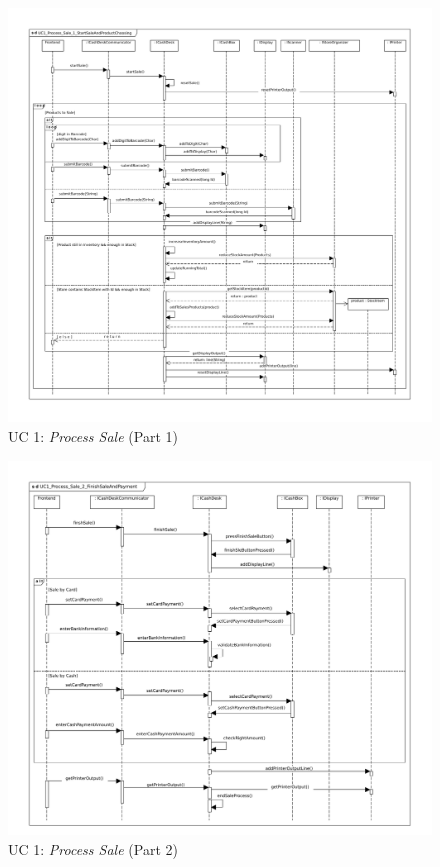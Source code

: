 		
			\begin{figure}[!h]
				\centering
				\includegraphics[width = 1\textwidth]{img/UC1_Process_Sale_1_StartSaleAndProductChoosing.pdf}
				\caption{UC 1: \textit{Process Sale} (Part 1)}
				\label{MS_UC1_1}
			\end{figure}
			
			\begin{figure}[!h]
				\centering
				\includegraphics[width = 1\textwidth]{img/UC1_Process_Sale_2_FinishSaleAndPayment.pdf}
				\caption{UC 1: \textit{Process Sale} (Part 2)}
				\label{MS_UC1_2}
			\end{figure}
			
